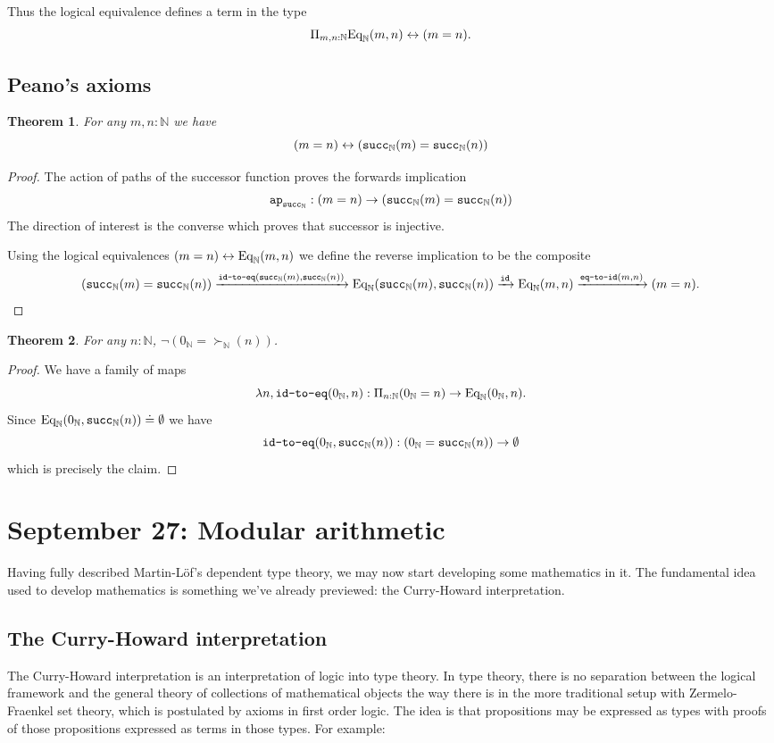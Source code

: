 \documentclass{amsart}
\theoremstyle{theorem}
\newtheorem*{thm}{Theorem}
\theoremstyle{definition}
\theoremstyle{remark}
\newcommand{\0}{\mathbbe{0}}
\newcommand{\1}{\mathbbe{1}}
\newcommand{\2}{\mathbbe{2}}
\newcommand{\3}{\mathbbe{3}}
\newcommand{\4}{\mathbbe{4}}
\newcommand{\term}[1]{{\textup{\texttt{#1}}}}
\newcommand{\id}{\term{id}}
\newcommand{\bN}{{\mathbb{N}}}
\newcommand{\suc}{\term{succ}_{\bN}}
\newcommand{\ap}{\term{ap}}
\newcommand{\Eq}{\textup{\text{Eq}}}
\begin{document}
Thus the logical equivalence defines a term in the type
\[ \Pi_{m,n : \bN} \Eq_\bN(m,n) \leftrightarrow (m=n).\]

\subsection*{Peano's axioms}

\begin{thm} For any $m,n : \bN$ we have
\[ (m=n) \leftrightarrow (\suc(m) = \suc(n))\]
\end{thm}
\begin{proof}
The action of paths of the successor function proves the forwards implication
\[ \ap_{\suc} : (m=n) \to (\suc(m) = \suc(n))\]
The direction of interest is the converse which proves that successor is injective.

Using the logical equivalences $(m=n) \leftrightarrow \Eq_\bN(m,n)$ we define the reverse implication to be the composite
\[ (\suc(m) = \suc(n)) \xrightarrow{\term{id-to-eq}(\suc(m),\suc(n))} 
\Eq_\bN(\suc(m),\suc(n)) \xrightarrow{\id} \Eq_\bN(m,n) \xrightarrow{\term{eq-to-id}(m,n)} (m=n).\]
\end{proof}

\begin{thm} For any $n : \bN$, $\neg(0_\bN  = \succ_\bN(n))$.
\end{thm}
\begin{proof}
We have a family of maps
\[ \lambda n, \term{id-to-eq}(0_\bN,n) : \Pi_{n : \bN} (0_\bN = n) \to \Eq_\bN(0_\bN,n).\]
Since $\Eq_\bN(0_\bN, \suc(n)) \doteq \emptyset$ we have
\[ \term{id-to-eq}(0_\bN,\suc(n)) : (0_\bN = \suc(n)) \to \emptyset\]
which is precisely the claim.
\end{proof}

\section*{September 27: Modular arithmetic}

Having fully described Martin-L\"{o}f's dependent type theory, we may now start developing some mathematics in it. The fundamental idea used to develop mathematics is something we've already previewed: the Curry-Howard interpretation.

\subsection*{The Curry-Howard interpretation}

The Curry-Howard interpretation is an interpretation of logic into type theory. In type theory, there is no separation between the logical framework and the general theory of collections of mathematical objects the way there is in the more traditional setup with Zermelo-Fraenkel set theory, which is postulated by axioms in first order logic. The idea is that propositions may be expressed as types with proofs of those propositions expressed as terms in those types. For example:
\end{document}
